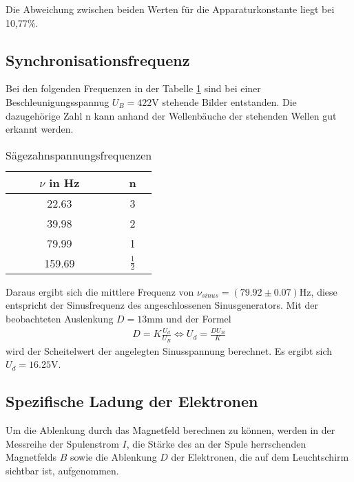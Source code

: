 Die Abweichung zwischen beiden Werten für die Apparaturkonstante liegt bei 10,77\%.

\subsection{Synchronisationsfrequenz}
\label{synchro}

Bei den folgenden Frequenzen in der Tabelle \ref{tab:messwerte4} sind bei einer Beschleunigungsspannug $U_B = 422$V stehende Bilder entstanden.
Die dazugehörige Zahl n kann anhand der Wellenbäuche der stehenden Wellen gut erkannt werden.

\FloatBarrier
\begin{table}
  \centering
  \caption{Sägezahnspannungsfrequenzen}
  \label{tab:messwerte4}
  \begin{tabular}{c c}
  \toprule
   $\nu$ in Hz & n \\
  \midrule
  22.63 & 3 \\
  39.98 & 2 \\
  79.99  & 1 \\
  159.69 & $\frac{1}{2}$ \\
  \bottomrule
  \bottomrule
\end{tabular}
\end{table}

Daraus ergibt sich die mittlere Frequenz von $\nu_{sinus} = (79.92 \pm 0.07) \text{Hz}$, diese entspricht der Sinusfrequenz des angeschlossenen Sinusgenerators.
Mit der beobachteten Auslenkung $D = 13$mm und der Formel
\begin{align*}
  D = K \frac{U_d}{U_B} \Leftrightarrow U_d = \frac{D U_B}{K}
\end{align*}
wird der Scheitelwert der angelegten Sinusspannung berechnet.
Es ergibt sich $U_d = 16.25$V.


\subsection{Spezifische Ladung der Elektronen}
\label{spezLadung}

Um die Ablenkung durch das Magnetfeld berechnen zu können, werden in der Messreihe
der Spulenstrom $I$, die Stärke des an der Spule herrschenden Magnetfelds $B$ sowie die Ablenkung $D$ der Elektronen, die auf dem Leuchtschirm sichtbar ist, aufgenommen.

